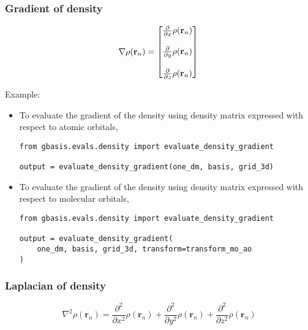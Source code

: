 \documentclass[letterpaper]{article}
\begin{document}
\subsubsection{Gradient of density}
\begin{equation}
  \nabla \rho(\mathbf{r}_n)
  =
  \begin{bmatrix}
    \frac{\partial}{\partial x} \rho(\mathbf{r}_n)\\\\
    \frac{\partial}{\partial y} \rho(\mathbf{r}_n)\\\\
    \frac{\partial}{\partial z} \rho(\mathbf{r}_n)
  \end{bmatrix}\\
\end{equation}

Example:
\begin{itemize}
\item To evaluate the gradient of the density using density matrix expressed
  with respect to atomic orbitals,
  \begin{lstlisting}[xleftmargin=-25pt]
from gbasis.evals.density import evaluate_density_gradient

output = evaluate_density_gradient(one_dm, basis, grid_3d)
\end{lstlisting}
\item To evaluate the gradient of the density using density matrix expressed
  with respect to molecular orbitals,
  \begin{lstlisting}[xleftmargin=-25pt]
from gbasis.evals.density import evaluate_density_gradient

output = evaluate_density_gradient(
    one_dm, basis, grid_3d, transform=transform_mo_ao
)
\end{lstlisting}
\end{itemize}
\subsubsection{Laplacian of density}
\begin{equation}
  \nabla^2 \rho(\mathbf{r}_n)
  =
  \frac{\partial^2}{\partial x^2} \rho(\mathbf{r}_n)
  + \frac{\partial^2}{\partial y^2} \rho(\mathbf{r}_n)
  + \frac{\partial^2}{\partial z^2} \rho(\mathbf{r}_n)
\end{equation}
\end{document}
